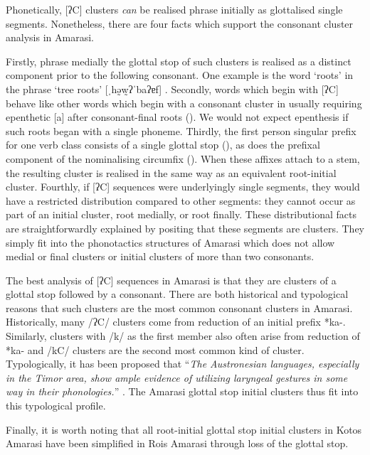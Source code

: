 Phonetically, [ʔC] clusters \emph{can} be realised
phrase initially as glottalised single segments.
Nonetheless, there are four facts which
support the consonant cluster analysis in Amarasi.

Firstly, phrase medially the glottal stop of such clusters
is realised as a distinct component prior to the following consonant.
One example is the word  `roots' in the phrase
 `tree roots' {\ra} [ˌhə̰w̰ʔˈbaʔɐf] {}.
Secondly, words which begin with [ʔC] behave like other words which begin with a consonant cluster
in usually requiring epenthetic [a] after consonant-final roots ().
We would not expect epenthesis if such roots began with a single phoneme.
Thirdly, the first person singular prefix for one verb class
consists of a single glottal stop  (), as does the prefixal
component of the nominalising circumfix  ().
When these affixes attach to a stem, the resulting cluster
is realised in the same way as an equivalent root-initial cluster.
Fourthly, if [ʔC] sequences were underlyingly single segments,
they would have a restricted distribution compared to other segments:
they cannot occur as part of an initial cluster, root medially, or root finally.
These distributional facts are straightforwardly explained by
positing that these segments are clusters.
They simply fit into the phonotactics structures of Amarasi
which does not allow medial or final clusters or initial
clusters of more than two consonants.

The best analysis of [ʔC] sequences in Amarasi
is that they are clusters of a glottal stop followed by a consonant.
There are both historical and typological reasons that such
clusters are the most common consonant clusters in Amarasi.
Historically, many /ʔC/ clusters come from reduction of an initial prefix *ka-.
Similarly, clusters with /k/ as the first member also
often arise from reduction of *ka- \citep[387f]{ed18b}
and /kC/ clusters are the second most common kind of cluster.
Typologically, it has been proposed that ``\emph{The Austronesian languages,
especially in the Timor area, show ample evidence of
utilizing laryngeal gestures in some way in their phonologies.}'' \citep[216]{do03}.
The Amarasi glottal stop initial clusters thus fit into this typological profile.

Finally, it is worth noting that all root-initial glottal
stop initial clusters in Kotos Amarasi have
been simplified in Ro{\Q}is Amarasi through loss
of the glottal stop.